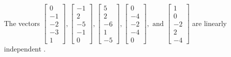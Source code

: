 \begin{exercise}
\begin{exerciseStatement}
  \end{exerciseStatement}
  \begin{exerciseAnswer}
   The vectors \(\left[\begin{array}{r}
0 \\
-1 \\
-2 \\
-3 \\
1
\end{array}\right] , \left[\begin{array}{r}
-1 \\
2 \\
-5 \\
-1 \\
0
\end{array}\right] , \left[\begin{array}{r}
5 \\
2 \\
-6 \\
1 \\
-5
\end{array}\right] , \left[\begin{array}{r}
0 \\
-4 \\
-2 \\
-4 \\
0
\end{array}\right] , \text{ and } \left[\begin{array}{r}
1 \\
0 \\
-2 \\
2 \\
-4
\end{array}\right]\) are 
  	 linearly independent  .
  


  \end{exerciseAnswer}
\end{exercise}